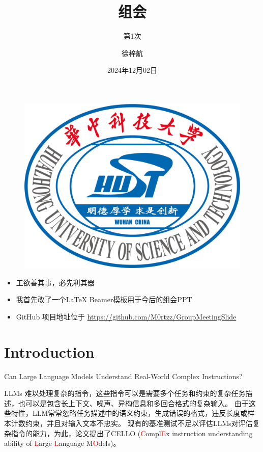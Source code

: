 \documentclass{beamer}
\author{徐梓航}
\title{组会}
\subtitle{第1次}
\institute{华中科技大学计算机科学与技术学院}
\date{2024年12月02日}
\begin{document}
\kaishu
\begin{frame}
    \titlepage
    \begin{figure}[htpb]
        \begin{center}
            \includegraphics[width=0.2\linewidth]{images/templates/HUST_LOGO.png}
        \end{center}
    \end{figure}
\end{frame}

\begin{frame}
    \begin{itemize}[<+->] %
        \item {工欲善其事，必先利其器}
        \item {我首先改了一个\LaTeX{} Beamer模板用于今后的组会PPT}
        \item GitHub 项目地址位于 \url{https://github.com/M0rtzz/GroupMeetingSlide}
    \end{itemize}
\end{frame}

\begin{frame}
    \tableofcontents[sectionstyle=show,subsectionstyle=show/shaded/hide,subsubsectionstyle=show/shaded/hide]
\end{frame}

\section{Introduction}

\begin{frame}{Can Large Language Models Understand Real-World Complex Instructions?}

    LLMs 难以处理复杂的指令，这些指令可以是需要多个任务和约束的复杂任务描述，也可以是包含长上下文、噪声、异构信息和多回合格式的复杂输入。
    \newline
    \newline
    由于这些特性，LLM常常忽略任务描述中的语义约束，生成错误的格式，违反长度或样本计数约束，并且对输入文本不忠实。
    \newline
    \newline
    现有的基准测试不足以评估LLMs对评估复杂指令的能力，为此，论文提出了CELLO (\textcolor{red}{C}ompl\textcolor{red}{E}x instruction understanding ability of \textcolor{red}{L}arge \textcolor{red}{L}anguage M\textcolor{red}{O}dels)。

\end{frame}
\end{document}
